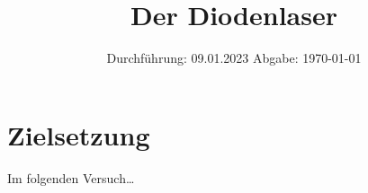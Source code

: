 

\subject{V60}
\title{Der Diodenlaser}
\date{
    Durchführung: 09.01.2023
     \hspace{3em}
    Abgabe: \today %
}


\maketitle
\thispagestyle{empty}
\tableofcontents
\newpage

\section{Zielsetzung}

    Im folgenden Versuch… %


\clearpage


\clearpage


\clearpage


\clearpage

\printbibliography


